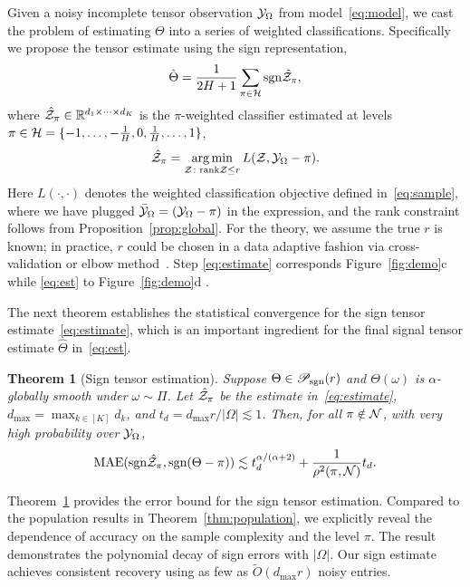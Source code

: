 \documentclass[11pt]{article}
\theoremstyle{plain}
\newtheorem{thm}{Theorem}
\theoremstyle{definition}
\def\sign{\textup{sgn}}
\def\caliP{\mathscr{P}_{\textup{sgn}}}
\begin{document}
Given a noisy incomplete tensor observation $\mathcal{Y}_\Omega$ from model~\eqref{eq:model}, we cast the problem of estimating $\Theta$ into a series of weighted classifications. Specifically we propose the tensor estimate using the sign representation,
\begin{equation}\label{eq:est}
\hat \Theta = {1\over 2H+1}\sum_{\pi \in \tH}\sign{\hat \tZ_\pi},
\end{equation}
where $\hat {\mathcal{Z}}_\pi\in\mathbb{R}^{d_1\times \dots\times d_K}$ is the $\pi$-weighted classifier estimated at levels $\pi \in \mathcal{H}=\{-1,\ldots,-{1\over H}, 0, {1\over H},\ldots,1\}$,
\begin{equation}\label{eq:estimate}
\hat {\mathcal{Z}}_\pi = \operatorname*{arg\,min}_{\mathcal{Z}\colon \text{rank}\mathcal{Z}\leq r} L(\mathcal{Z}, \mathcal{Y}_\Omega-\pi).
\end{equation}
Here $L(\cdot,\cdot)$ denotes the weighted classification objective defined in~\eqref{eq:sample}, where we have plugged $\bar {\mathcal{Y}}_\Omega=(\mathcal{Y}_\Omega-\pi)$ in the expression, and the rank constraint follows from Proposition~\ref{prop:global}. For the theory, we assume the true $r$ is known; in practice, $r$ could be chosen in a data adaptive fashion via cross-validation or elbow method~\citep{hastie2009elements}. Step  \eqref{eq:estimate} corresponds Figure~\ref{fig:demo}c while  \eqref{eq:est} to Figure~\ref{fig:demo}d .

The next theorem establishes the statistical convergence for the sign tensor estimate~\eqref{eq:estimate}, which is an important ingredient for the final signal tensor estimate $\hat \Theta$ in~\eqref{eq:est}. 

 \begin{thm}[Sign tensor estimation]\label{thm:classification} Suppose $\Theta\in\caliP(r)$ and $\Theta(\omega)$ is $\alpha$-globally smooth under $\omega\sim \Pi$. Let $\hat {\mathcal{Z}}_\pi$ be the estimate in~\eqref{eq:estimate}, $d_{\max}=\max_{k\in[K]} d_k$, and $t_d =d_{\max}r/|\Omega|\lesssim 1$. Then, for all $\pi\notin\mathcal{N}$, with very high probability over $\mathcal{Y}_\Omega$, 
\begin{align}\label{eq:bound}
\textup{MAE}(\sign \hat \tZ_\pi, \sign(\Theta-\pi)) \lesssim t_d^{\alpha/( \alpha+2)}+{1 \over \rho^2(\pi, \tN)}t_d.
\end{align}
\end{thm}
Theorem~\ref{thm:classification} provides the error bound for the sign tensor estimation. Compared to the population results in Theorem~\ref{thm:population}, we explicitly reveal the dependence of accuracy on the sample complexity and the level $\pi$. The result demonstrates the polynomial decay of sign errors with $|\Omega|$.  Our sign estimate achieves consistent recovery using as few as $\tilde O(d_{\max}r)$ noisy entries. 
\end{document}
